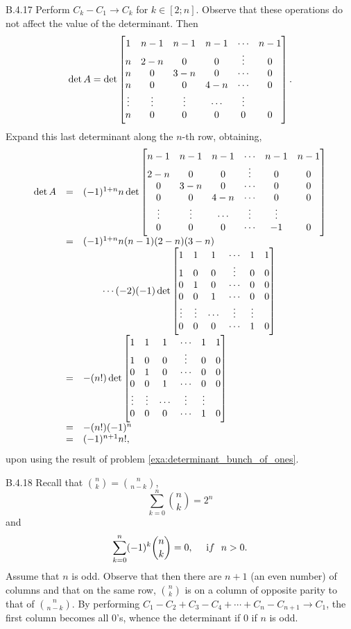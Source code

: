 \begin{Answer}{B.4.17}
Perform $C_k - C_1 \rightarrow C_k$ for $k \in [2; n]$. Observe that
these operations do not affect the value of the determinant. Then
$$\det A = \det\begin{bmatrix} 1 & n - 1 & n - 1 & n - 1 & \cdots & n - 1 \cr n & 2 - n &
0 & 0 & \vdots & 0 \cr n & 0 & 3 - n & 0 & \cdots & 0 \cr n & 0 &
0 & 4-n & \cdots & 0 \cr \vdots & \vdots & \vdots & \cdots &
\vdots \cr n & 0 & 0 & 0 & 0 & 0 \cr
\end{bmatrix}.
$$Expand this last determinant along the $n$-th row, obtaining,
$$\begin{array}{lll}\det A & = &  (-1)^{1 + n}n\det\begin{bmatrix}  n - 1 & n - 1 & n - 1 & \cdots & n - 1 & n - 1 \cr  2 - n &
0 & 0 & \vdots & 0  & 0 \cr  0 & 3 - n & 0 & \cdots & 0  & 0 \cr 0
& 0 & 4-n & \cdots & 0  & 0 \cr  \vdots & \vdots & \cdots & \vdots
& \vdots \cr 0 & 0 & 0 & \cdots & -1 & 0  \cr
\end{bmatrix} \\
& = & (-1)^{1 + n}n(n - 1)(2 - n)(3 - n)\\ & & \qquad \cdots
(-2)(-1) \det\begin{bmatrix}  1 & 1 & 1 & \cdots & 1 & 1 \cr  1& 0
& 0 & \vdots & 0  & 0 \cr  0 & 1 & 0 & \cdots & 0  & 0 \cr 0 & 0 &
1& \cdots & 0  & 0 \cr  \vdots & \vdots & \cdots & \vdots & \vdots
\cr 0 & 0 & 0 & \cdots & 1 & 0  \cr
\end{bmatrix} \\
& = & -(n!)\det\begin{bmatrix}  1 & 1 & 1 & \cdots & 1 & 1 \cr  1&
0 & 0 & \vdots & 0  & 0 \cr  0 & 1 & 0 & \cdots & 0  & 0 \cr 0 & 0
& 1& \cdots & 0  & 0 \cr  \vdots & \vdots & \cdots & \vdots &
\vdots \cr 0 & 0 & 0 & \cdots & 1 & 0  \cr
\end{bmatrix} \\
& = & -(n!)(-1)^{n} \\
& = & (-1)^{n + 1}n!,
\end{array}$$
upon using the result of problem
\ref{exa:determinant_bunch_of_ones}.
\end{Answer}
\begin{Answer}{B.4.18}
 Recall
that $\binom{n}{k} = \binom{n}{n - k}$, $$ \sum _{k = 0} ^n
\binom{n}{k} = 2^n  $$ and$$ \sum _{k = 0} ^n (-1)^{k}\binom{n}{k}
= 0, \ \ \ \ {\textrm  if}\ \ n > 0. $$ Assume that $n$ is odd. Observe
that then there are $n + 1$  (an even number) of columns and that
on the same row, $\binom{n}{k}$ is on a column of opposite parity
to that of $\binom{n}{n - k}$. By performing  $C_1 - C_2 + C_3 -
C_4 + \cdots + C_n - C_{n + 1} \rightarrow C_1$, the first column
becomes all $0$'s, whence the determinant if $0$ if $n$ is odd.
\end{Answer}
